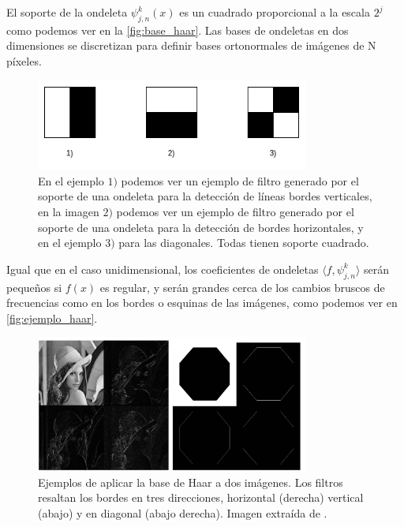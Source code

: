 \medskip

\noindent El soporte de la ondeleta $\psi_{j,n}^k(x)$ es un cuadrado proporcional a la escala $2^j$ como podemos ver en la \autoref{fig:base_haar}. Las bases de ondeletas en dos dimensiones se discretizan para definir bases ortonormales de imágenes de N píxeles.


\begin{figure} [!h]
  \centering
  \includegraphics[width=0.8\textwidth]{img/base_haar_2d.png}
  \caption{En el ejemplo $1)$ podemos ver un ejemplo de filtro generado por el soporte de una ondeleta para la detección de líneas bordes verticales, en la imagen $2)$ podemos ver un ejemplo de filtro generado por el soporte de una ondeleta para la detección de bordes horizontales, y en el ejemplo $3)$ para las diagonales. Todas tienen soporte cuadrado.}
  \label{fig:base_haar}
\end{figure}

\noindent Igual que en el caso unidimensional, los coeficientes de ondeletas $\langle f,\psi_{j,n}^k \rangle$ serán pequeños si $f(x)$ es regular, y serán grandes cerca de los cambios bruscos de frecuencias como en los bordes o esquinas de las imágenes, como podemos ver en \autoref{fig:ejemplo_haar}.

\begin{figure} [!h]
  \centering
  \includegraphics[width=0.8\textwidth]{img/ejemplos_haar_basis.png}
  \caption{Ejemplos de aplicar la base de Haar a dos imágenes. Los filtros resaltan los bordes en tres direcciones, horizontal (derecha) vertical (abajo) y en diagonal (abajo derecha). Imagen extraída de \cite{HaarBasis}.}
  \label{fig:ejemplo_haar}
\end{figure}

